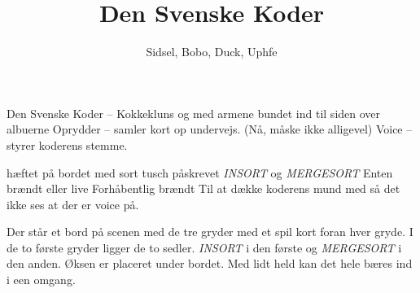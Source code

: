 \documentclass[danish]{article}
\title{Den Svenske Koder}
\author{Sidsel, Bobo, Duck, Uphfe}
\begin{document}
\maketitle

\begin{roles}
   Den Svenske Koder -- Kokkekluns og med armene bundet ind
  til siden over albuerne
   Oprydder -- samler kort op undervejs. (Nå, måske ikke
  alligevel) 
   Voice -- styrer koderens stemme.
\end{roles}

\begin{props}
   hæftet på bordet
   med sort tusch påskrevet \emph{INSORT} og
  \emph{MERGESORT} 
   Enten brændt eller live
   Forhåbentlig brændt
   Til at dække koderens mund med så det ikke ses at der er
  voice på.
\end{props}

Der står et bord på scenen med de tre gryder med et spil kort foran
hver gryde. I de to første gryder ligger de to sedler. \emph{INSORT} i
den første og \emph{MERGESORT} i den anden. Øksen er placeret under
bordet. Med lidt held kan det hele bæres ind i een omgang.
\end{document}
